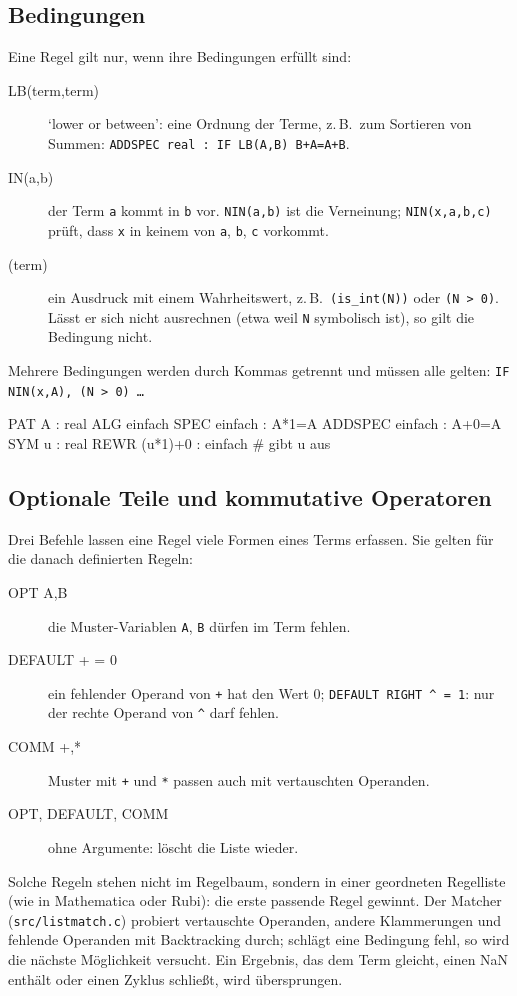 \documentclass[a4paper,11pt]{article}
\newcommand{\kw}[1]{\texttt{#1}}
\begin{document}
\subsection{Bedingungen}
Eine Regel gilt nur, wenn ihre Bedingungen erfüllt sind:
\begin{description}
\item[LB(term,term)] `lower or between': eine Ordnung der Terme, z.\,B.\
  zum Sortieren von Summen: \kw{ADDSPEC real : IF LB(A,B) B+A=A+B}.
\item[IN(a,b)] der Term \kw{a} kommt in \kw{b} vor. \kw{NIN(a,b)} ist
  die Verneinung; \kw{NIN(x,a,b,c)} prüft, dass \kw{x} in keinem von
  \kw{a}, \kw{b}, \kw{c} vorkommt.
\item[(term)] ein Ausdruck mit einem Wahrheitswert, z.\,B.\
  \kw{(is\_int(N))} oder \kw{(N > 0)}. Lässt er sich nicht ausrechnen
  (etwa weil \kw{N} symbolisch ist), so gilt die Bedingung nicht.
\end{description}
Mehrere Bedingungen werden durch Kommas getrennt und müssen alle gelten:
\kw{IF NIN(x,A), (N > 0) \ldots}

\begin{beispiel}
PAT A : real
ALG einfach
SPEC einfach : A*1=A
ADDSPEC einfach : A+0=A
SYM u : real
REWR (u*1)+0 : einfach      # gibt u aus
\end{beispiel}

\subsection{Optionale Teile und kommutative Operatoren}
Drei Befehle lassen eine Regel viele Formen eines Terms erfassen. Sie
gelten für die danach definierten Regeln:
\begin{description}
\item[OPT A,B] die Muster-Variablen \kw{A}, \kw{B} dürfen im Term fehlen.
\item[DEFAULT + = 0] ein fehlender Operand von \kw{+} hat den Wert 0;
  \kw{DEFAULT RIGHT \^{} = 1}: nur der rechte Operand von \kw{\^{}} darf
  fehlen.
\item[COMM +,*] Muster mit \kw{+} und \kw{*} passen auch mit vertauschten
  Operanden.
\item[OPT, DEFAULT, COMM] ohne Argumente: löscht die Liste wieder.
\end{description}
Solche Regeln stehen nicht im Regelbaum, sondern in einer geordneten
Regelliste (wie in Mathematica oder Rubi): die erste passende Regel
gewinnt. Der Matcher (\kw{src/listmatch.c}) probiert vertauschte
Operanden, andere Klammerungen und fehlende Operanden mit Backtracking
durch; schlägt eine Bedingung fehl, so wird die nächste Möglichkeit
versucht. Ein Ergebnis, das dem Term gleicht, einen NaN enthält oder einen
Zyklus schließt, wird übersprungen.
\end{document}
